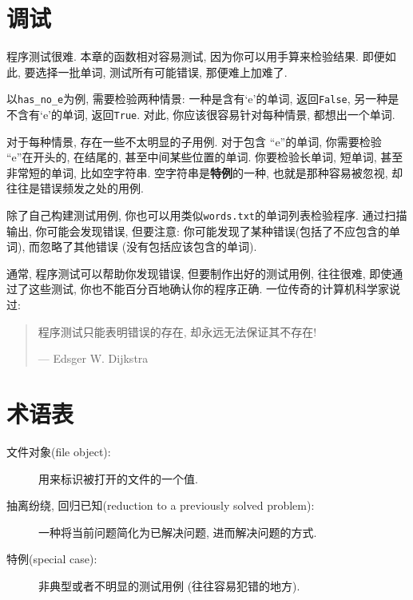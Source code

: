 \documentclass[10pt]{book}
\begin{document}
\section{调试}

程序测试很难. 本章的函数相对容易测试, 因为你可以用手算来检验结果. 
即便如此, 要选择一批单词, 测试所有可能错误, 那便难上加难了. 

以\verb"has_no_e"为例, 需要检验两种情景: 一种是含有`e'的单词, 返回{\tt False}, 
另一种是不含有`e'的单词, 返回{\tt True}. 
对此, 你应该很容易针对每种情景, 都想出一个单词. 

对于每种情景, 存在一些不太明显的子用例. 
对于包含 ``e''的单词, 你需要检验 ``e''在开头的, 在结尾的, 甚至中间某些位置的单词. 
你要检验长单词, 短单词, 甚至非常短的单词, 比如空字符串. 
空字符串是{\bf 特例}的一种, 也就是那种容易被忽视, 却往往是错误频发之处的用例. 

除了自己构建测试用例, 你也可以用类似{\tt words.txt}的单词列表检验程序. 
通过扫描输出, 你可能会发现错误, 但要注意: 
你可能发现了某种错误(包括了不应包含的单词), 而忽略了其他错误
(没有包括应该包含的单词). 

通常, 程序测试可以帮助你发现错误, 但要制作出好的测试用例, 
往往很难, 即使通过了这些测试, 你也不能百分百地确认你的程序正确. 
一位传奇的计算机科学家说过:

\begin{quote}

程序测试只能表明错误的存在, 却永远无法保证其不存在!

--- Edsger W. Dijkstra
\end{quote}


\section{术语表}

\begin{description}

\item[文件对象(file object):] 用来标识被打开的文件的一个值.

\item[抽离纷绕, 回归已知(reduction to a previously solved problem):] 一种将当前问题简化为已解决问题, 进而解决问题的方式.

\item[特例(special case):] 非典型或者不明显的测试用例
(往往容易犯错的地方).

\end{description}
\end{document}
